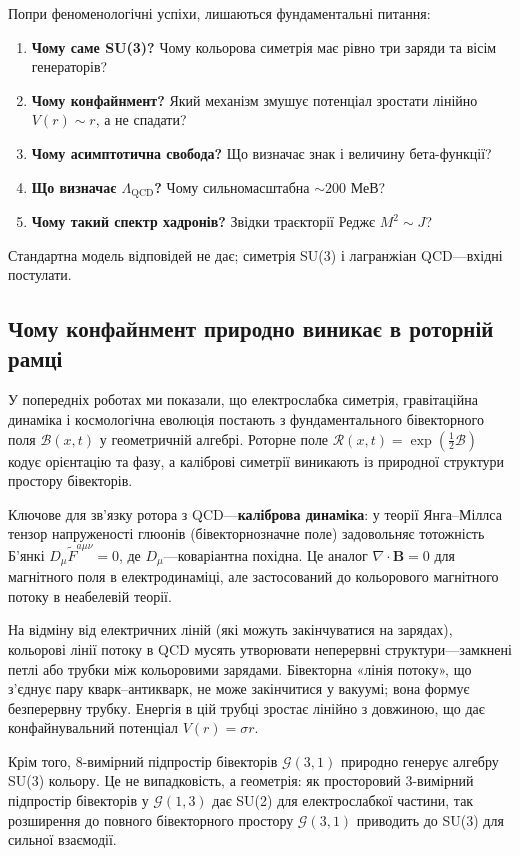 \documentclass[11pt,a4paper]{article}
\newcommand{\Rotor}{\mathcal{R}}
\newcommand{\Biv}{\mathcal{B}}
\newcommand{\Cl}{\mathcal{G}}
\theoremstyle{definition}
\theoremstyle{plain}
\theoremstyle{remark}
\begin{document}
Попри феноменологічні успіхи, лишаються фундаментальні питання:
\begin{enumerate}[leftmargin=*,itemsep=3pt]
  \item \textbf{Чому саме SU(3)?} Чому кольорова симетрія має рівно три заряди та вісім генераторів?
  \item \textbf{Чому конфайнмент?} Який механізм змушує потенціал зростати лінійно $V(r)\sim r$, а не спадати?
  \item \textbf{Чому асимптотична свобода?} Що визначає знак і величину бета-функції?
  \item \textbf{Що визначає $\Lambda_{\mathrm{QCD}}$?} Чому сильномасштабна $\sim 200$ МеВ?
  \item \textbf{Чому такий спектр хадронів?} Звідки траєкторії Реджє $M^2\sim J$?
\end{enumerate}

Стандартна модель відповідей не дає; симетрія SU(3) і лагранжіан QCD—вхідні постулати.

\subsection{Чому конфайнмент природно виникає в роторній рамці}

У попередніх роботах ми показали, що електрослабка симетрія, гравітаційна динаміка і космологічна еволюція постають з фундаментального бівекторного поля $\Biv(x,t)$ у геометричній алгебрі. Роторне поле $\Rotor(x,t)=\exp(\frac{1}{2}\Biv)$ кодує орієнтацію та фазу, а каліброві симетрії виникають із природної структури простору бівекторів.

Ключове для зв’язку ротора з QCD—\textbf{каліброва динаміка}: у теорії Янга–Міллса тензор напруженості глюонів (бівекторнозначне поле) задовольняє тотожність Б’янкі $D_\mu \tilde{F}^{a\mu\nu}=0$, де $D_\mu$—коваріантна похідна. Це аналог $\nabla\cdot\mathbf{B}=0$ для магнітного поля в електродинаміці, але застосований до кольорового магнітного потоку в неабелевій теорії.

На відміну від електричних ліній (які можуть закінчуватися на зарядах), кольорові лінії потоку в QCD мусять утворювати неперервні структури—замкнені петлі або трубки між кольоровими зарядами. Бівекторна «лінія потоку», що з’єднує пару кварк–антикварк, не може закінчитися у вакуумі; вона формує безперервну трубку. Енергія в цій трубці зростає лінійно з довжиною, що дає конфайнувальний потенціал $V(r)=\sigma r$.

Крім того, 8-вимірний підпростір бівекторів $\Cl(3,1)$ природно генерує алгебру SU(3) кольору. Це не випадковість, а геометрія: як просторовий 3-вимірний підпростір бівекторів у $\Cl(1,3)$ дає SU(2) для електрослабкої частини, так розширення до повного бівекторного простору $\Cl(3,1)$ приводить до SU(3) для сильної взаємодії.
\end{document}
